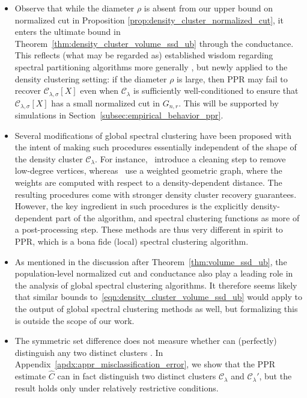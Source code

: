 \documentclass[11pt,twoside]{article}
\theoremstyle{definition}
\newcommand{\1}{\mathbf{1}}
\newcommand{\mc}[1]{\mathcal{#1}}
\newcommand{\wh}[1]{\widehat{#1}}
\begin{document}
\begin{itemize}
	\item Observe that while the diameter $\rho$ is absent from our upper bound on normalized cut in Proposition \ref{prop:density_cluster_normalized_cut}, it enters the ultimate bound in Theorem~\ref{thm:density_cluster_volume_ssd_ub} through the conductance. This reflects
	(what may be regarded as) established wisdom regarding spectral partitioning
	algorithms more generally \citep{guattery1995, hein2010}, but newly applied
	to the density clustering setting: if the diameter $\rho$ is large, then PPR
	may fail to recover $\mc{C}_{\lambda,\sigma}[X]$ even when $\mc{C}_{\lambda}$ is sufficiently well-conditioned to ensure that $\mc{C}_{\lambda,\sigma}[X]$ has a small normalized cut in $G_{n,r}$. This will be supported by simulations in Section~\ref{subsec:empirical_behavior_ppr}.   
	\item Several modifications of global spectral clustering have been proposed with the intent of making such procedures essentially independent of the shape of the density cluster $\mc{C}_{\lambda}$. For instance,~\citet{arias-castro2009,pelletier2011} introduce a cleaning step to remove low-degree vertices, whereas~\cite{little2020} use a weighted geometric graph, where the weights are computed with respect to a density-dependent distance. The resulting procedures come with stronger density cluster recovery guarantees. However, the key ingredient in such procedures is the explicitly density-dependent part of the algorithm, and spectral clustering functions as more of a post-processing step. These methods are thus very different in spirit to PPR, which is a bona fide (local) spectral clustering algorithm. 
	\item As mentioned in the discussion after Theorem~\ref{thm:volume_ssd_ub}, the population-level normalized cut and conductance also play a leading role in the analysis of global spectral clustering algorithms. It therefore seems likely that similar bounds to~\eqref{eqn:density_cluster_volume_ssd_ub} would apply to the output of global spectral clustering methods as well, but formalizing this is outside the scope of our work.
	\item The symmetric set difference does not measure whether \smash{$\wh{C}$}
	can (perfectly) distinguish any two distinct clusters \smash{$\mc{C}_{\lambda},\mc{C}_{\lambda}' \in \mathbb{C}_f(\lambda)$}. In Appendix~\ref{apdx:appr_misclassification_error}, we show that the PPR estimate $\wh{C}$ can in fact distinguish two distinct clusters $\mc{C}_{\lambda}$ and $\mc{C}_{\lambda}'$, but the result holds only under relatively restrictive conditions.
\end{itemize}
\end{document}
